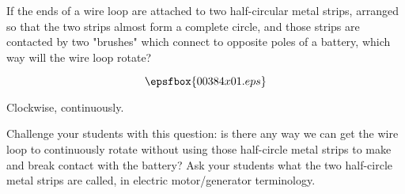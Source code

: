 

If the ends of a wire loop are attached to two half-circular metal strips, arranged so that the two strips almost form a complete circle, and those strips are contacted by two "brushes" which connect to opposite poles of a battery, which way will the wire loop rotate?

$$\epsfbox{00384x01.eps}$$







Clockwise, continuously.







Challenge your students with this question: is there any way we can get the wire loop to continuously rotate without using those half-circle metal strips to make and break contact with the battery?  Ask your students what the two half-circle metal strips are called, in electric motor/generator terminology.




